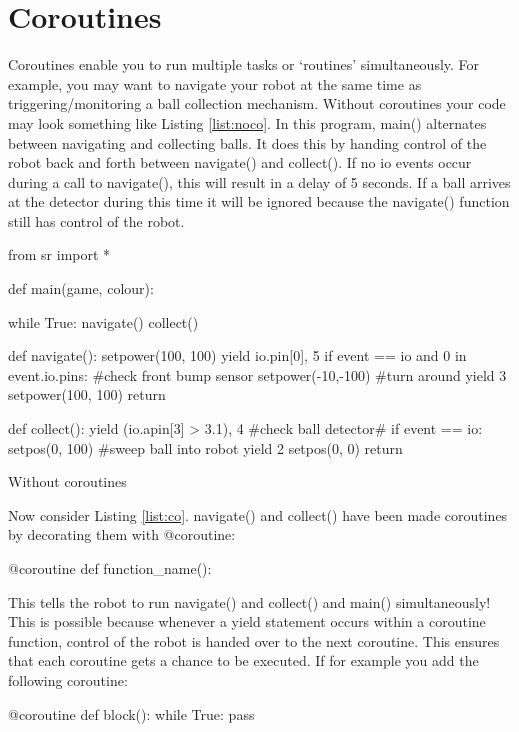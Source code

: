 \documentclass[a4paper, 12pt]{article}
\begin{document}
\section{Coroutines}
Coroutines enable you to run multiple tasks or `routines' simultaneously. For example, you may want to navigate your robot at the same time as triggering/monitoring a ball collection mechanism. Without coroutines your code may look something like Listing \ref{list:noco}. In this program, main() alternates between navigating and collecting balls. It does this by handing control of the robot back and forth between navigate() and collect(). If no io events occur during a call to navigate(), this will result in a delay of 5 seconds. If a ball arrives at the detector during this time it will be ignored because the navigate() function still has control of the robot.
\begin{python}
\begin{verbatimtab}
from sr import *

def main(game, colour):
    
    while True:
        navigate()
        collect()
 
def navigate():
    setpower(100, 100)
    yield io.pin[0], 5
    if event == io and 0 in event.io.pins:    #check front bump sensor
        setpower(-10,-100)    #turn around
        yield 3  
        setpower(100, 100)      
    return
    
def collect():
    yield (io.apin[3] > 3.1), 4    #check ball detector#
    if event == io:
        setpos(0, 100)    #sweep ball into robot
        yield 2
        setpos(0, 0)
    return
\end{verbatimtab}
\caption{\label{list:noco} Without coroutines}
\end{python}

Now consider Listing \ref{list:co}. navigate() and collect() have been made coroutines by decorating them with @coroutine:
\begin{verbatimtab}
@coroutine
def	function_name():
\end{verbatimtab}

This tells the robot to run navigate() and collect() and main() simultaneously! This is possible because whenever a yield statement occurs within a coroutine function, control of the robot is handed over to the next coroutine. This ensures that each coroutine gets a chance to be executed. If for example you add the following coroutine:

\begin{verbatimtab}
@coroutine
def block():
	while True:
		pass 
\end{verbatimtab}
\end{document}
